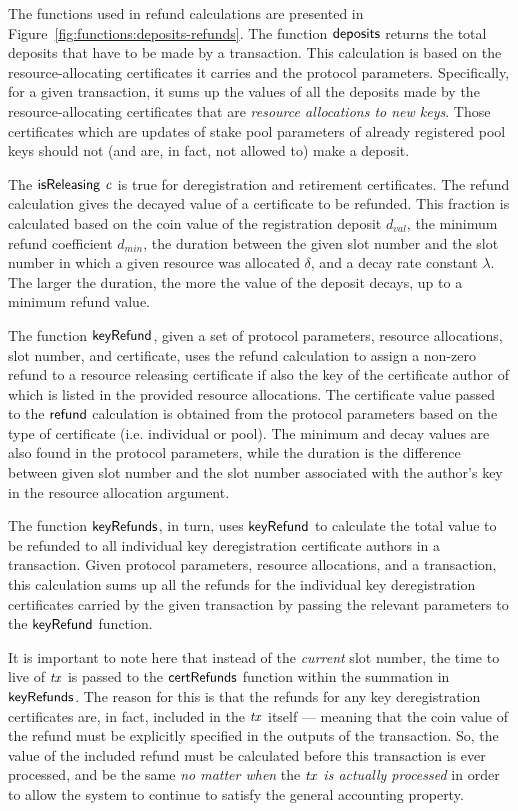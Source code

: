 \documentclass[11pt,a4paper,dvipsnames]{article}
\theoremstyle{definition}
\theoremstyle{definition}
\begin{document}
The functions used in refund calculations are presented in
Figure~\ref{fig:functions:deposits-refunds}.
The function
$\mathsf{deposits}$ returns the total deposits that have to be made by a transaction.
This calculation is
based on the resource-allocating certificates it carries and the protocol parameters.
Specifically, for a given transaction,
it sums up the values of all the deposits made by the resource-allocating
certificates that are \textit{resource allocations to new keys}.  Those
certificates which are
updates of stake pool parameters of already registered pool keys should not
(and are, in fact, not allowed to) make a deposit.

The $\mathsf{isReleasing}~\mathit{c}$ is true for deregistration and retirement
certificates. The refund calculation gives the decayed value of a
certificate to be refunded. This fraction is calculated
based on the coin value of the registration deposit $d_{val}$, the minimum
refund coefficient $d_{min}$, the
duration between the given slot number and the slot number in
which a given resource was allocated $\delta$, and a decay rate constant $\lambda$.
The larger the duration, the more
the value of the deposit decays, up to a minimum refund value.

The function $\mathsf{keyRefund}$, given a set of protocol parameters, resource
allocations, slot number, and certificate, uses the refund calculation to
assign a non-zero refund to a resource releasing certificate if also the key of
the certificate author of which is listed in the provided resource allocations.
The certificate value passed to the $\mathsf{refund}$ calculation is obtained from
the protocol parameters based on the type of certificate (i.e. individual or pool).
The minimum and decay values are also found in the protocol parameters, while
the duration is the difference between given slot number and the slot
number associated with the author's key in the resource allocation argument.

The function $\mathsf{keyRefunds}$, in turn, uses $\mathsf{keyRefund}$ to calculate
the total value to be refunded to all individual key deregistration
certificate authors in a transaction.
Given protocol parameters, resource allocations, and a transaction,
this calculation sums up all the refunds for the individual key
deregistration certificates
carried by the given transaction by passing the relevant parameters to the
$\mathsf{keyRefund}$ function.

It is important to note here that instead of the \textit{current} slot number,
the time to live of $\mathit{tx}$ is passed to the $\mathsf{certRefunds}$ function
within the summation in $\mathsf{keyRefunds}$. The reason for this is that the
refunds for any key deregistration certificates are, in fact, included in
the $\mathit{tx}$ itself --- meaning that the coin value of the refund must be
explicitly specified in the outputs of the transaction. So,
the value of the included refund must be calculated before this transaction
is ever processed, and be the same \textit{no matter when} the $\mathit{tx}$
\textit{is actually processed} in order to allow the system to continue to
satisfy the general accounting property.
\end{document}
